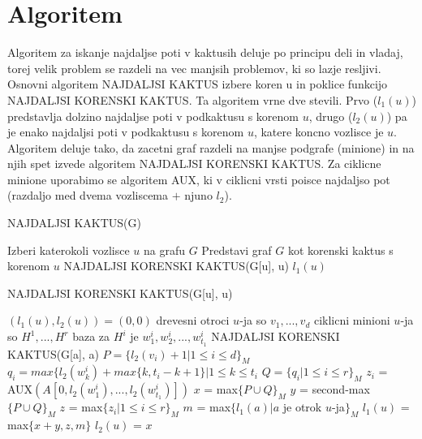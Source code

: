 \documentclass{article}
\begin{document}
\section{Algoritem}

Algoritem za iskanje najdaljse poti v kaktusih deluje po principu deli in vladaj, torej velik problem se razdeli na vec manjsih problemov, ki so lazje resljivi. Osnovni algoritem NAJDALJSI KAKTUS izbere koren u in poklice funkcijo NAJDALJSI KORENSKI KAKTUS. Ta algoritem vrne dve stevili. Prvo ($l_1(u)$) predstavlja dolzino najdaljse poti v podkaktusu s korenom $u$, drugo ($l_2(u)$) pa je enako najdaljsi poti v podkaktusu s korenom $u$, katere koncno vozlisce je $u$. Algoritem deluje tako, da zacetni graf razdeli na manjse podgrafe (minione) in na njih spet izvede algoritem NAJDALJSI KORENSKI KAKTUS. Za ciklicne minione uporabimo se algoritem AUX, ki v ciklicni vrsti poisce najdaljso pot (razdaljo med dvema vozliscema $+$ njuno $l_2$).

\begin{algorithm}
\begin{algorithmic}[1]
\caption{NAJDALJSI KAKTUS(G)}
\State Izberi katerokoli vozlisce $u$ na grafu $G$
\State Predstavi graf $G$ kot korenski kaktus s korenom $u$
\State NAJDALJSI KORENSKI KAKTUS(G[u], u)
\State \Return $l_1(u)$
\end{algorithmic}
\end{algorithm}

\begin{algorithm}
\begin{algorithmic}[1]
\caption{NAJDALJSI KORENSKI KAKTUS(G[u], u)}
    \State $(l_1(u), l_2(u)) = (0,0)$
\Else
    \State drevesni otroci $u$-ja so $v_1, ..., v_d$
    \State ciklicni minioni $u$-ja so $H^1, ..., H^r$
    \State baza za $H^i$ je $w_1^i, w_2^i, ..., w^i_{t_1}$
        \State NAJDALJSI KORENSKI KAKTUS(G[a], a)
    \EndFor
    \State $P = \{l_2(v_i) + 1|1 \leq i \leq d\}_M$
        \State $q_i = max\{l_2(w^i_k) + max\{k, t_i-k+1\}|1\leq k \leq t_i$
    \EndFor
    \State $Q = \{q_i|1 \leq i \leq r\}_M$
        \State $z_i$ = AUX$(A[0, l_2(w_1^i), ..., l_2(w^i_{t_1})])$
    \EndFor
    \State $x$ = max$\{ P \cup Q \}_M$
    \State $y$ = second-max$\{ P \cup Q \}_M$
    \State $z$ = max$\{z_i|1 \leq i \leq r\}_M$
    \State $m$ = max$\{l_1(a)| a$ je otrok $u$-ja$\}_M$
    \State $l_1(u)$ = max$\{x+y, z, m \}$
    \State $l_2(u)$ = $x$
\EndIf
\end{algorithmic}
\end{algorithm}
\end{document}
